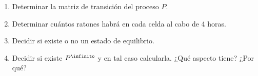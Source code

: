 \begin{enunciado}{\ejercicio}
  \begin{enumerate}[label=(\alph*)]
    \item Determinar la matriz de transición del proceso $P$.
    \item Determinar cuántos ratones habrá en cada celda al cabo de 4 horas.
    \item Decidir si existe o no un estado de equilibrio.
    \item Decidir si existe $P^\infinito$ y en tal caso calcularla. ¿Qué aspecto tiene? ¿Por qué?
  \end{enumerate}
\end{enunciado}
\hacer
